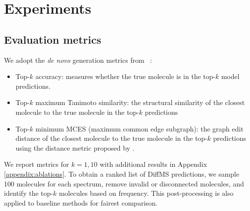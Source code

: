 \documentclass{article}
\theoremstyle{plain}
\theoremstyle{definition}
\theoremstyle{remark}
\newcommand{\ours}{DiffMS\xspace}
\begin{document}
\section{Experiments}
\subsection{Evaluation metrics}
We adopt the \emph{de novo} generation metrics from ~\citet{bushuiev2024massspecgymbenchmarkdiscoveryidentification}:
\begin{itemize}[noitemsep,topsep=0pt] 
    \item Top-$k$ accuracy: measures whether the true molecule is in the top-$k$ model predictions.
    \item Top-$k$ maximum Tanimoto similarity: the structural similarity of the closest molecule to the true molecule in the top-$k$ predictions %
    \item Top-$k$ minimum MCES (maximum common edge subgraph): the graph edit distance of the closest molecule to the true molecule in the top-$k$ predictions using the distance metric proposed by \citet{Kretschmer2023.03.27.534311}. %
\end{itemize}





We report metrics for $k=1, 10$ with additional results in Appendix \ref{appendix:ablations}. %
To obtain a ranked list of \ours predictions, we sample 100 molecules for each spectrum, remove invalid or disconnected molecules, and identify the top-$k$ molecules based on frequency. This post-processing is also applied to baseline methods for fairest comparison.
\end{document}
